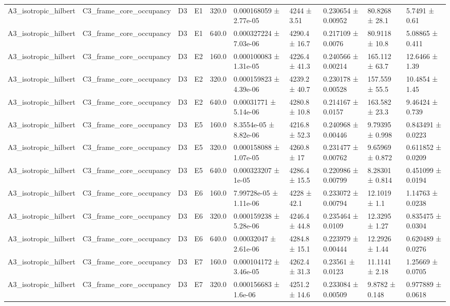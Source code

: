 \begin{table}
\begin{tabular}{llllllllll}
A3\_isotropic\_hilbert & C3\_frame\_core\_occupancy & D3 & E1 & 320.0 & 0.000168059 ± 2.77e-05 & 4244 ± 3.51 & 0.230654 ± 0.00952 & 80.8268 ± 28.1 & 5.7491 ± 0.61 \\
A3\_isotropic\_hilbert & C3\_frame\_core\_occupancy & D3 & E1 & 640.0 & 0.000327224 ± 7.03e-06 & 4290.4 ± 16.7 & 0.217109 ± 0.0076 & 80.9118 ± 10.8 & 5.08865 ± 0.411 \\
A3\_isotropic\_hilbert & C3\_frame\_core\_occupancy & D3 & E2 & 160.0 & 0.000100083 ± 1.31e-05 & 4226.4 ± 41.3 & 0.240566 ± 0.00214 & 165.112 ± 63.7 & 12.6466 ± 1.39 \\
A3\_isotropic\_hilbert & C3\_frame\_core\_occupancy & D3 & E2 & 320.0 & 0.000159823 ± 4.39e-06 & 4239.2 ± 40.7 & 0.230178 ± 0.00528 & 157.559 ± 55.5 & 10.4854 ± 1.45 \\
A3\_isotropic\_hilbert & C3\_frame\_core\_occupancy & D3 & E2 & 640.0 & 0.00031771 ± 5.14e-06 & 4280.8 ± 10.8 & 0.214167 ± 0.0157 & 163.582 ± 23.3 & 9.46424 ± 0.739 \\
A3\_isotropic\_hilbert & C3\_frame\_core\_occupancy & D3 & E5 & 160.0 & 8.3554e-05 ± 8.82e-06 & 4216.8 ± 52.3 & 0.240968 ± 0.00446 & 9.79395 ± 0.998 & 0.843491 ± 0.0223 \\
A3\_isotropic\_hilbert & C3\_frame\_core\_occupancy & D3 & E5 & 320.0 & 0.000158088 ± 1.07e-05 & 4260.8 ± 17 & 0.231477 ± 0.00762 & 9.65969 ± 0.872 & 0.611852 ± 0.0209 \\
A3\_isotropic\_hilbert & C3\_frame\_core\_occupancy & D3 & E5 & 640.0 & 0.000323207 ± 1e-05 & 4286.4 ± 15.5 & 0.220986 ± 0.00799 & 8.28301 ± 0.814 & 0.451099 ± 0.0194 \\
A3\_isotropic\_hilbert & C3\_frame\_core\_occupancy & D3 & E6 & 160.0 & 7.99728e-05 ± 1.11e-06 & 4228 ± 42.1 & 0.233072 ± 0.00794 & 12.1019 ± 1.1 & 1.14763 ± 0.0238 \\
A3\_isotropic\_hilbert & C3\_frame\_core\_occupancy & D3 & E6 & 320.0 & 0.000159238 ± 5.28e-06 & 4246.4 ± 44.8 & 0.235464 ± 0.0109 & 12.3295 ± 1.27 & 0.835475 ± 0.0304 \\
A3\_isotropic\_hilbert & C3\_frame\_core\_occupancy & D3 & E6 & 640.0 & 0.00032047 ± 2.61e-06 & 4284.8 ± 15.1 & 0.223979 ± 0.00444 & 12.2926 ± 1.44 & 0.620489 ± 0.0276 \\
A3\_isotropic\_hilbert & C3\_frame\_core\_occupancy & D3 & E7 & 160.0 & 0.000104172 ± 3.46e-05 & 4262.4 ± 31.3 & 0.23561 ± 0.0123 & 11.1141 ± 2.18 & 1.25669 ± 0.0705 \\
A3\_isotropic\_hilbert & C3\_frame\_core\_occupancy & D3 & E7 & 320.0 & 0.000156683 ± 1.6e-06 & 4251.2 ± 14.6 & 0.233084 ± 0.00509 & 9.8782 ± 0.148 & 0.977889 ± 0.0618 \\

\end{tabular}
\end{table}
